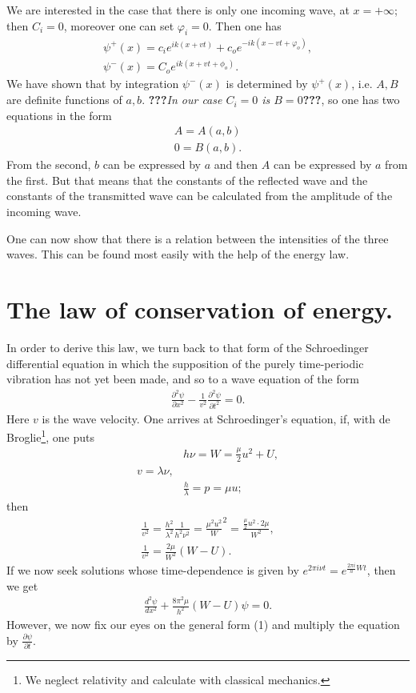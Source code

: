 \documentclass[a4paper,11pt]{article}
\newcommand{\WTF}[1]{\textbf{???}\textit{#1}\textbf{???}}
\newcommand{\?}[2]{#1\footnote{\textsc{Translator note}: #2}}
\newcommand{\nequ}[2]{\begin{align*}\tag{#1}#2\end{align*}}
\newcommand{\uequ}[1]{\begin{align*}#1\end{align*}}
\renewcommand{\exp}[1]{e^{#1}}
\begin{document}
We are interested in the case that there is only one incoming wave, at $x=+\infty$; then $C_i=0$, moreover one can set $\varphi_{i} = 0$. Then one has
\nequ{11}{
\psi^+(x) = c_i \exp{ik(x+vt)} + c_o \exp{-ik(x-vt+\varphi_o)},\\
\psi^-(x) = C_o \exp{ik(x+vt+\phi_o)}.
}
We have shown that by integration $\psi^-(x)$ is determined by $\psi^+(x)$, i.e. $A,B$ are definite functions of $a,b$. \WTF{In our case $C_i=0$ is $B=0$}, so one has two equations in the form
\nequ{12}{
A=A(a, b)\\
0=B(a,b).
}
From the second, $b$ can be expressed by $a$ and then $A$ can be expressed by $a$ from the first. But that means that the constants of the reflected wave and the constants of the transmitted wave can be calculated from the amplitude of the incoming wave. 

One can now show that there is a relation between the intensities of the three waves. This can be found most easily with the help of the energy law.

\section{The law of conservation of energy.} In order to derive this law, we turn back to that form of the Schroedinger differential equation in which the supposition of the purely time-periodic vibration  has not yet been made, and so to a wave equation of the form
\nequ{1}{
\frac{\partial^2\psi}{\partial x^2} - \frac{1}{v^2}\frac{\partial^2 \psi}{\partial t^2} =0.
}
Here $v$ is the wave velocity. One arrives at Schroedinger's equation, if, with de Broglie\footnote{We neglect relativity and calculate with classical mechanics.}, one puts
\uequ{
&h\nu = W = \frac{\mu}{2}u^2 + U,\\
v=\lambda \nu, &\\
&\frac{h}{\lambda} = p = \mu u;
}
then 
\nequ{2}{
\frac{1}{v^2} = \frac{h^2}{\lambda^2}\frac{1}{h^2 \nu^2} = \frac{\mu^2 u^2}W^2 = \frac{\frac{\mu}{2}u^2\cdot 2\mu}{W^2},\\
\frac{1}{v^2} = \frac{2\mu}{W^2}(W-U).
}
If we now seek solutions whose time-dependence is given by $\exp{2\pi i\nu t} = \exp{\frac{2\pi i}{h}Wt}$, then we get
\uequ{
\frac{d^2\psi}{dx^2}+\frac{8\pi^2\mu}{h^2}(W-U)\psi = 0.
}
However, we now fix our eyes on the general form (1) and multiply the equation by $\frac{\partial\psi}{\partial t}$.
\end{document}
